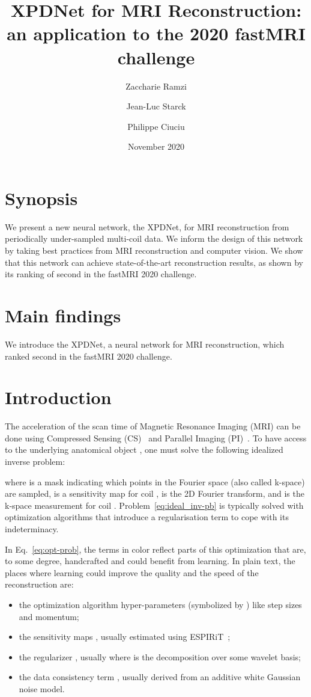 \documentclass{article}
\title{XPDNet for MRI Reconstruction: an application to the 2020 fastMRI challenge}
\author[1]{Zaccharie Ramzi}
\author[2]{Jean-Luc Starck}
\author[3]{Philippe Ciuciu}
\affil[1]{CEA (Neurospin \& Cosmostat), Inria (Parietal)}
\affil[2]{AIM, CEA, CNRS, Université Paris-Saclay, Université Paris Diderot, Sorbonne Paris Cité}
\affil[3]{Neurospin, Inria (Parietal)}
\date{November 2020}
\begin{document}
\maketitle

\section{Synopsis}
We present a new neural network, the XPDNet, for MRI reconstruction from periodically under-sampled multi-coil data. 
We inform the design of this network by taking best practices from MRI reconstruction and computer vision.
We show that this network can achieve state-of-the-art reconstruction results, as shown by its ranking of second in the fastMRI 2020 challenge.

\section{Main findings}
We introduce the XPDNet, a neural network for MRI reconstruction, which ranked second in the fastMRI 2020 challenge.



\section{Introduction}

The acceleration of the scan time of Magnetic Resonance Imaging (MRI) can be done using Compressed Sensing (CS)~\cite{Lustig2007} and Parallel Imaging (PI)~\cite{Griswold2002GeneralizedGRAPPA, Pruessmann1999SENSE:MRI}.
To have access to the underlying anatomical object , one must solve the following idealized inverse problem:

where  is a mask indicating which points in the Fourier space (also called k-space) are sampled,  is a sensitivity map for coil ,  is the 2D Fourier transform, and  is the k-space measurement for coil . Problem~\eqref{eq:ideal_inv-pb} is typically solved with optimization algorithms that introduce a regularisation term to cope with its indeterminacy.



In Eq.~\eqref{eq:opt-prob}, the terms in color reflect parts of this optimization that are, to some degree, handcrafted and could benefit from learning.
In plain text, the places where learning could improve the quality and the speed of the reconstruction are:
\begin{itemize}
    \item the optimization algorithm hyper-parameters (symbolized by ) like step sizes and momentum;
    \item the sensitivity maps , usually estimated using ESPIRiT~\cite{Uecker2014ESPIRiT-AnAccess};
    \item the regularizer , usually  where  is the decomposition over some wavelet basis;
    \item the data consistency term , usually derived from an additive white Gaussian noise model.
\end{itemize}
\end{document}
